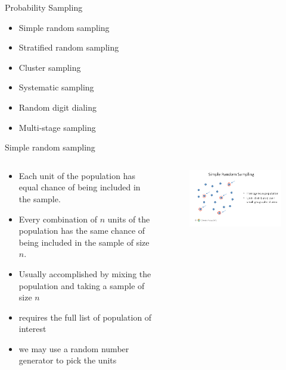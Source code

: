 \documentclass[10pt, compress]{beamer}
\begin{document}
\begin{frame}[t]{Probability Sampling}
    \begin{itemize}
        \item Simple random sampling
        \item Stratified random sampling
        \item Cluster sampling
        \item Systematic sampling
        \item Random digit dialing
        \item Multi-stage sampling
    \end{itemize}
\end{frame}

\begin{frame}[t]{Simple random sampling}
    \begin{columns}
        \begin{block}{}
            \begin{itemize}
                \item Each unit of the population has equal chance of being included in the sample.
                \item Every combination of $n$ units of the population has the same chance of being included in the sample of size $n$.
                \item Usually accomplished by mixing the population and taking a sample of size $n$
                \item requires the full list of population of interest
                \item we may use a random number generator to pick the units
            \end{itemize}
        \end{block}
        \begin{block}{}
            \begin{figure}
                \begin{center}
                    \includegraphics[scale=0.25]{img/Slide2.png}
                \end{center}
            \end{figure}
        \end{block}
    \end{columns}
\end{frame}
\end{document}
